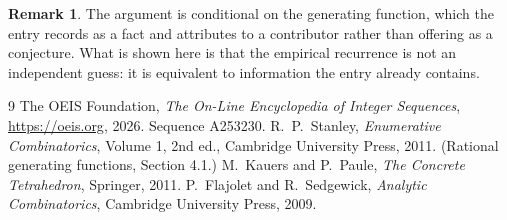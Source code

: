 \documentclass[11pt,a4paper]{article}
\theoremstyle{plain}
\theoremstyle{definition}
\newtheorem{remark}[theorem]{Remark}
\begin{document}
\begin{remark}
The argument is conditional on the generating function, which the entry records as a fact and
attributes to a contributor rather than offering as a conjecture. What is shown here is that
the empirical recurrence is not an independent guess: it is equivalent to information the
entry already contains.
\end{remark}

\begin{thebibliography}{9}
 The OEIS Foundation, \emph{The On-Line Encyclopedia of Integer
Sequences}, \url{https://oeis.org}, 2026. Sequence A253230.
 R.~P.~Stanley, \emph{Enumerative Combinatorics}, Volume 1, 2nd ed.,
Cambridge University Press, 2011. (Rational generating functions, Section 4.1.)
 M.~Kauers and P.~Paule, \emph{The Concrete Tetrahedron}, Springer, 2011.
 P.~Flajolet and R.~Sedgewick, \emph{Analytic Combinatorics}, Cambridge
University Press, 2009.
\end{thebibliography}
\end{document}
